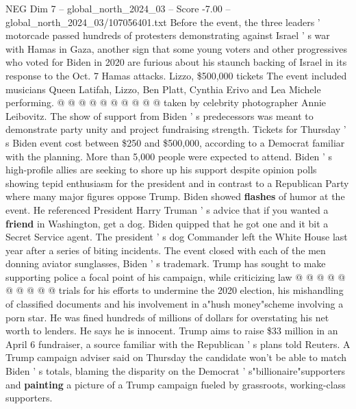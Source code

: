 \begin{textsample}{NEG Dim 7 – global\_north\_2024\_03 – Score -7.00 – global\_north\_2024\_03/107056401.txt}
Before the event, the three leaders ' motorcade passed hundreds of protesters demonstrating against Israel ' s war with Hamas in Gaza, another sign that some young voters and other progressives who voted for Biden in 2020 are furious about his staunch backing of Israel in its response to the Oct. 7 Hamas attacks.
Lizzo, \$500,000 tickets The event included musicians Queen Latifah, Lizzo, Ben Platt, Cynthia Erivo and Lea Michele performing. @ @ @ @ @ @ @ @ @ @ taken by celebrity photographer Annie Leibovitz.
The show of support from Biden ' s predecessors was meant to demonstrate party unity and project fundraising strength.
Tickets for Thursday ' s Biden event cost between \$250 and \$500,000, according to a Democrat familiar with the planning.
More than 5,000 people were expected to attend.
Biden ' s high-profile allies are seeking to shore up his support despite opinion polls showing tepid enthusiasm for the president and in contrast to a Republican Party where many major figures oppose Trump.
Biden showed \textbf{flashes} of humor at the event.
He referenced President Harry Truman ' s advice that if you wanted a \textbf{friend} in Washington, get a dog.
Biden quipped that he got one and it bit a Secret Service agent.
The president ' s dog Commander left the White House last year after a series of biting incidents.
The event closed with each of the men donning aviator sunglasses, Biden ' s trademark.
Trump has sought to make supporting police a focal point of his campaign, while criticizing law @ @ @ @ @ @ @ @ @ @ trials for his efforts to undermine the 2020 election, his mishandling of classified documents and his involvement in a"hush money"scheme involving a porn star.
He was fined hundreds of millions of dollars for overstating his net worth to lenders.
He says he is innocent.
Trump aims to raise \$33 million in an April 6 fundraiser, a source familiar with the Republican ' s plans told Reuters.
A Trump campaign adviser said on Thursday the candidate won't be able to match Biden ' s totals, blaming the disparity on the Democrat ' s"billionaire"supporters and \textbf{painting} a picture of a Trump campaign fueled by grassroots, working-class supporters.

\end{textsample}
